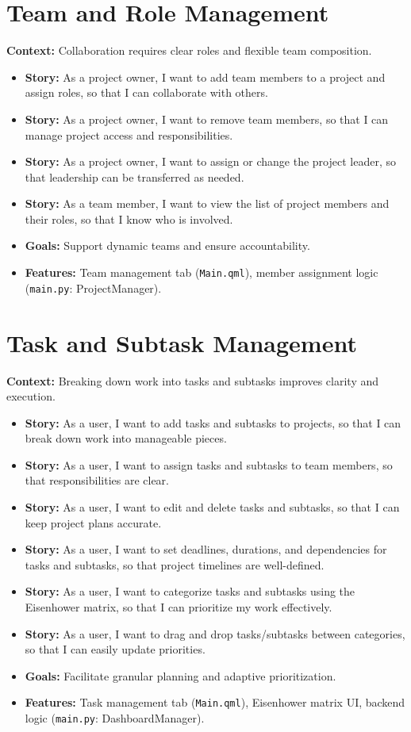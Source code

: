 \documentclass{report}
\begin{document}
\section{Team and Role Management}
\textbf{Context:} Collaboration requires clear roles and flexible team composition.
\begin{itemize}
    \item \textbf{Story:} As a project owner, I want to add team members to a project and assign roles, so that I can collaborate with others.
    \item \textbf{Story:} As a project owner, I want to remove team members, so that I can manage project access and responsibilities.
    \item \textbf{Story:} As a project owner, I want to assign or change the project leader, so that leadership can be transferred as needed.
    \item \textbf{Story:} As a team member, I want to view the list of project members and their roles, so that I know who is involved.
    \item \textbf{Goals:} Support dynamic teams and ensure accountability.
    \item \textbf{Features:} Team management tab (\texttt{Main.qml}), member assignment logic (\texttt{main.py}: ProjectManager).
\end{itemize}

\section{Task and Subtask Management}
\textbf{Context:} Breaking down work into tasks and subtasks improves clarity and execution.
\begin{itemize}
    \item \textbf{Story:} As a user, I want to add tasks and subtasks to projects, so that I can break down work into manageable pieces.
    \item \textbf{Story:} As a user, I want to assign tasks and subtasks to team members, so that responsibilities are clear.
    \item \textbf{Story:} As a user, I want to edit and delete tasks and subtasks, so that I can keep project plans accurate.
    \item \textbf{Story:} As a user, I want to set deadlines, durations, and dependencies for tasks and subtasks, so that project timelines are well-defined.
    \item \textbf{Story:} As a user, I want to categorize tasks and subtasks using the Eisenhower matrix, so that I can prioritize my work effectively.
    \item \textbf{Story:} As a user, I want to drag and drop tasks/subtasks between categories, so that I can easily update priorities.
    \item \textbf{Goals:} Facilitate granular planning and adaptive prioritization.
    \item \textbf{Features:} Task management tab (\texttt{Main.qml}), Eisenhower matrix UI, backend logic (\texttt{main.py}: DashboardManager).
\end{itemize}
\end{document}
